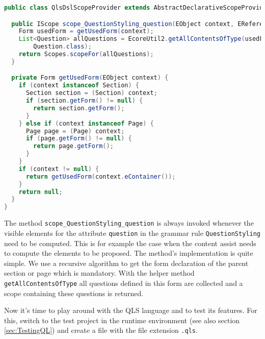 \begin{lstlisting}[language=Java]
public class QlsDslScopeProvider extends AbstractDeclarativeScopeProvider {

  public IScope scope_QuestionStyling_question(EObject context, EReference reference) {
    Form usedForm = getUsedForm(context);
    List<Question> allQuestions = EcoreUtil2.getAllContentsOfType(usedForm,
        Question.class);
    return Scopes.scopeFor(allQuestions);
  }

  private Form getUsedForm(EObject context) {
    if (context instanceof Section) {
      Section section = (Section) context;
      if (section.getForm() != null) {
        return section.getForm();
      }
    } else if (context instanceof Page) {
      Page page = (Page) context;
      if (page.getForm() != null) {
        return page.getForm();
      }
    }
    if (context != null) {
      return getUsedForm(context.eContainer());
    }
    return null;
  }
}
\end{lstlisting}

The method \texttt{scope\_QuestionStyling\_question} is always invoked whenever the visible
elements for the attribute \texttt{question} in the grammar rule \texttt{QuestionStyling} 
need to be computed. This is for example the case when the content assist needs
to compute the elements to be proposed. The method's implementation is quite
simple. We use a recursive algorithm to get the form declaration of the
parent section or page which is mandatory. With the helper method
\texttt{getAllContentsOfType} all questions defined in this form are collected
and a scope containing these questions is returned.

Now it's time to play around with the QLS language and to test its features. For this,
switch to the test project in the runtime environment (see also section \ref{sec:TestingQL})
and create a file with the file extension \texttt{.qls}.